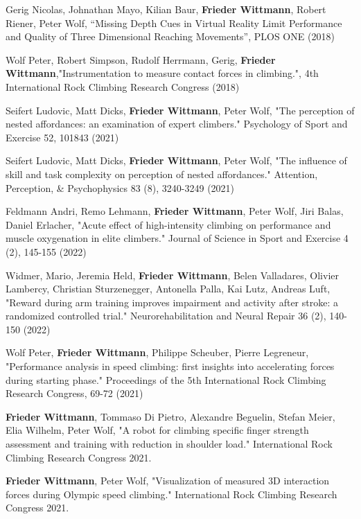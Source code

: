 \begin{cventries}
{\begin{cvitems}
\item{Gerig Nicolas, Johnathan Mayo, Kilian Baur, \textbf{Frieder Wittmann}, Robert Riener, Peter Wolf, “Missing Depth Cues in Virtual Reality Limit Performance and Quality of Three Dimensional Reaching Movements”, PLOS ONE (2018)}
\item{Wolf Peter, Robert Simpson, Rudolf Herrmann, Gerig, \textbf{Frieder Wittmann},"Instrumentation to measure contact forces in climbing.", 4th International Rock Climbing Research Congress (2018)}
\item{Seifert Ludovic, Matt Dicks, \textbf{Frieder Wittmann}, Peter Wolf, "The perception of nested affordances: an examination of expert climbers." Psychology of Sport and Exercise 52, 101843 (2021)}
\item{Seifert Ludovic, Matt Dicks, \textbf{Frieder Wittmann}, Peter Wolf, "The influence of skill and task complexity on perception of nested affordances." Attention, Perception, \& Psychophysics 83 (8), 3240-3249 (2021)}
\item{Feldmann Andri, Remo Lehmann, \textbf{Frieder Wittmann}, Peter Wolf, Jiri Balas, Daniel Erlacher, "Acute effect of high-intensity climbing on performance and muscle oxygenation in elite climbers." Journal of Science in Sport and Exercise 4 (2), 145-155 (2022)}
\item{Widmer, Mario, Jeremia Held, \textbf{Frieder Wittmann}, Belen Valladares, Olivier Lambercy, Christian Sturzenegger, Antonella Palla, Kai Lutz, Andreas Luft, "Reward during arm training improves impairment and activity after stroke: a randomized controlled trial." Neurorehabilitation and Neural Repair 36 (2), 140-150 (2022)}
\item{Wolf Peter, \textbf{Frieder Wittmann}, Philippe Scheuber, Pierre Legreneur, "Performance analysis in speed climbing: first insights into accelerating forces during starting phase." Proceedings of the 5th International Rock Climbing Research Congress, 69-72 (2021)}
\item{\textbf{Frieder Wittmann}, Tommaso Di Pietro, Alexandre Beguelin, Stefan Meier, Elia Wilhelm, Peter Wolf, "A robot for climbing specific finger strength assessment and training with reduction in shoulder load." International Rock Climbing Research Congress 2021.}
\item{\textbf{Frieder Wittmann}, Peter Wolf, "Visualization of measured 3D interaction forces during Olympic speed climbing." International Rock Climbing Research Congress 2021.}
      \end{cvitems}
}

\end{cventries}

